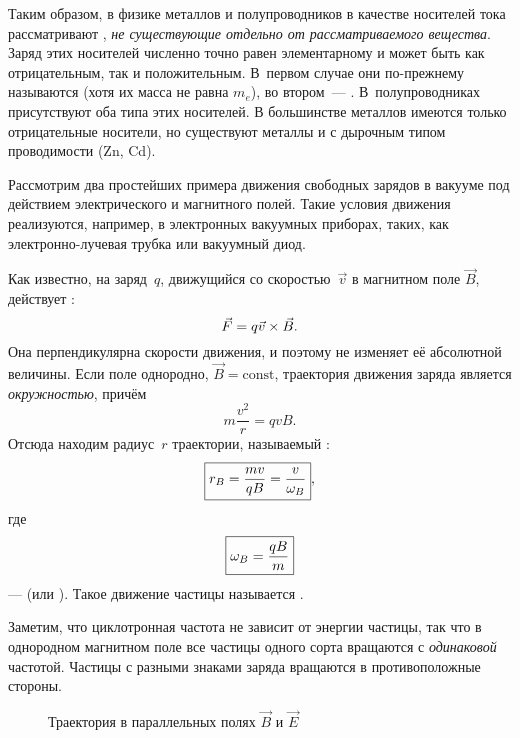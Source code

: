 Таким образом, в физике металлов и полупроводников в качестве носителей тока
рассматривают ,
\emph{не существующие отдельно от рассматриваемого вещества}.
Заряд этих носителей численно точно равен элементарному и может быть как
отрицательным, так и положительным. В~первом случае они по-прежнему называются
 (хотя их масса не равна $m_e$),
во втором~--- . В~полупроводниках присутствуют оба типа этих
носителей. В большинстве металлов имеются только отрицательные носители, но
существуют металлы и с дырочным типом проводимости (Zn, Cd).


\label{sec:freemotion}

Рассмотрим два простейших примера движения свободных зарядов в вакууме под
действием электрического и магнитного полей. Такие условия движения реализуются,
например, в электронных вакуумных приборах, таких, как электронно-лучевая
трубка или вакуумный диод.


Как известно, на заряд~$q$, движущийся со скоростью~$\vec{v}$ в магнитном поле
$\vec{B}$, действует :
\begin{equation*}
    \eqmark{3.1}
    \vec{F}=q{\vec{v}}\times{\vec{B}}.
\end{equation*}
Она перпендикулярна скорости движения, и поэтому не изменяет её абсолютной величины. 
Если поле однородно, $\vec{B}=\mathrm{const}$, траектория
движения заряда является \emph{окружностью}, причём
\[
m\frac{v^2}{r}=qvB.
\]
Отсюда находим радиус~$r$ траектории, называемый :
\begin{equation}
    \eqmark{3.2}
    \boxed{r_B =\frac{m v}{qB}= \frac{v}{\omega_B}},
\end{equation}
где
\begin{equation}
    \eqmark{omega-B}
    \boxed{\omega_B=\frac{qB}{m}}
\end{equation}
---  (или ).
Такое движение частицы называется .

Заметим, что циклотронная частота не зависит от энергии частицы, так
что в однородном магнитном поле все частицы одного сорта вращаются с
\emph{одинаковой} частотой. Частицы с разными знаками заряда вращаются в
противоположные стороны.

\begin{wrapfigure}{o}{0.25\textwidth}
\centering
 \caption{Траектория в параллельных полях $\vec{B}$ и $\vec{E}$}
\end{wrapfigure}

